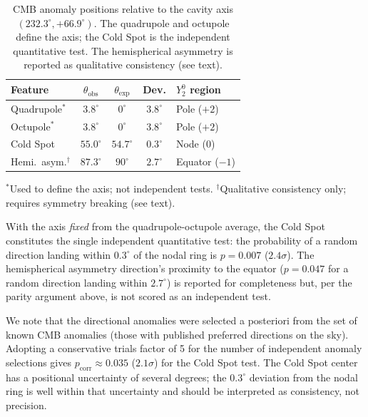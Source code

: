 \documentclass[aps,prd,twocolumn,superscriptaddress,showpacs,preprintnumbers,amsmath,amssymb,nofootinbib]{revtex4-2}
\begin{document}
\begin{table}[h]
\caption{\label{tab:anomalies}CMB anomaly positions relative to the cavity axis $(232.3^{\circ}, +66.9^{\circ})$. The quadrupole and octupole define the axis; the Cold Spot is the independent quantitative test. The hemispherical asymmetry is reported as qualitative consistency (see text).}
\begin{ruledtabular}
\begin{tabular}{lcccl}
Feature & $\theta_\mathrm{obs}$ & $\theta_\mathrm{exp}$ & Dev. & $Y_2^0$ region \\
\hline
Quadrupole$^*$ & $3.8^{\circ}$ & $0^{\circ}$ & $3.8^{\circ}$ & Pole ($+2$) \\
Octupole$^*$ & $3.8^{\circ}$ & $0^{\circ}$ & $3.8^{\circ}$ & Pole ($+2$) \\
Cold Spot & $55.0^{\circ}$ & $54.7^{\circ}$ & $0.3^{\circ}$ & Node ($0$) \\
Hemi.\ asym.$^\dagger$ & $87.3^{\circ}$ & $90^{\circ}$ & $2.7^{\circ}$ & Equator ($-1$) \\
\end{tabular}
\end{ruledtabular}
{\footnotesize $^*$Used to define the axis; not independent tests. $^\dagger$Qualitative consistency only; requires symmetry breaking (see text).}
\end{table}

With the axis \emph{fixed} from the quadrupole-octupole average, the Cold Spot constitutes the single independent quantitative test: the probability of a random direction landing within $0.3^{\circ}$ of the nodal ring is $p = 0.007$ ($2.4\sigma$). The hemispherical asymmetry direction's proximity to the equator ($p = 0.047$ for a random direction landing within $2.7^{\circ}$) is reported for completeness but, per the parity argument above, is not scored as an independent test.

We note that the directional anomalies were selected a posteriori from the set of known CMB anomalies (those with published preferred directions on the sky). Adopting a conservative trials factor of 5 for the number of independent anomaly selections gives $p_\mathrm{corr} \approx 0.035$ ($2.1\sigma$) for the Cold Spot test. The Cold Spot center has a positional uncertainty of several degrees; the $0.3^{\circ}$ deviation from the nodal ring is well within that uncertainty and should be interpreted as consistency, not precision.
\end{document}
